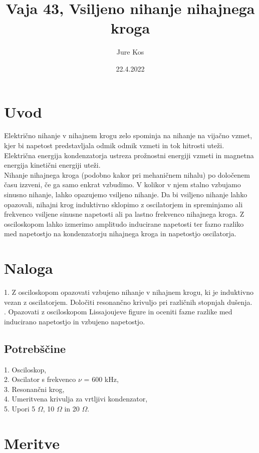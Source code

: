 \documentclass[a4paper]{report}
\author{Jure Kos}
\title{Vaja 43, Vsiljeno nihanje nihajnega kroga}
\date{22.4.2022}
\begin{document}
\maketitle

\chapter*{Uvod}
Električno nihanje v nihajnem krogu zelo spominja na nihanje na vijačno vzmet, kjer bi napetost predstavljala odmik odmik vzmeti in tok hitrosti uteži. Električna energija kondenzatorja ustreza prožnostni energiji vzmeti in magnetna energija kinetični energiji uteži.\\

Nihanje nihajnega kroga (podobno kakor pri mehaničnem nihalu) po določenem času izzveni, če ga samo enkrat vzbudimo. V kolikor v njem stalno vzbujamo sinusno nihanje, lahko opazujemo vsiljeno nihanje.  Da bi vsiljeno nihanje lahko opazovali, nihajni krog induktivno sklopimo z oscilatorjem in spreminjamo ali frekvenco vsiljene sinusne napetosti ali pa lastno frekvenco nihajnega kroga. Z osciloskopom lahko izmerimo amplitudo inducirane napetosti ter fazno razliko med napetostjo na kondenzatorju nihajnega kroga in napetostjo oscilatorja.

\chapter*{Naloga}
1. Z osciloskopom opazovati vzbujeno nihanje v nihajnem krogu, ki je induktivno vezan z oscilatorjem. Določiti resonančno krivuljo pri različnih stopnjah dušenja. \\
. Opazovati z osciloskopom Lissajoujeve figure in oceniti fazne razlike med inducirano napetostjo in vzbujeno napetostjo.

\section*{Potrebščine}
1. Osciloskop,\\
2. Oscilator s frekvenco $\nu$ = 600 kHz,\\
3. Resonančni krog, \\
4. Umeritvena krivulja za vrtljivi kondenzator, \\
5. Upori 5 $\Omega$, 10 $\Omega$ in 20 $\Omega$.


\chapter*{Meritve}
\end{document}

